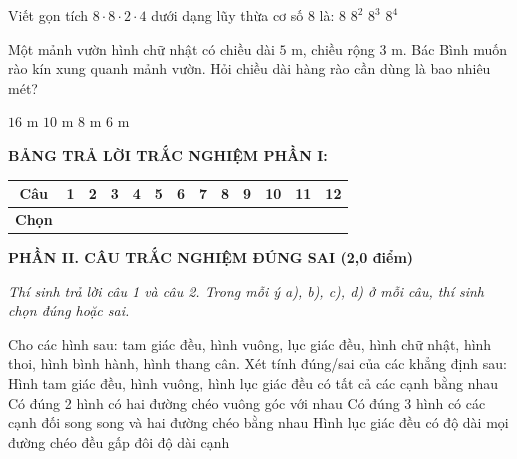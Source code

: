 \documentclass[12pt,a4paper]{article}
\begin{document}
\begin{ex}
Viết gọn tích $8 \cdot 8 \cdot 2 \cdot 4$ dưới dạng lũy thừa cơ số 8 là:
\choice
{$8$}
{$8^2$}
{\True $8^3$}
{$8^4$}
\end{ex}

\begin{ex}
Một mảnh vườn hình chữ nhật có chiều dài $5\text{ m}$, chiều rộng $3\text{ m}$. Bác Bình muốn rào kín xung quanh mảnh vườn. Hỏi chiều dài hàng rào cần dùng là bao nhiêu mét?
\begin{center}
\end{center}
\choice
{\True $16\text{ m}$}
{$10\text{ m}$}
{$8\text{ m}$}
{$6\text{ m}$}
\end{ex}


\vspace{1mm}
\noindent\textbf{BẢNG TRẢ LỜI TRẮC NGHIỆM PHẦN I:}
\begin{center}
\begin{tabular}{|c|c|c|c|c|c|c|c|c|c|c|c|c|}
\hline
\textbf{Câu} & \textbf{1} & \textbf{2} & \textbf{3} & \textbf{4} & \textbf{5} & \textbf{6} & \textbf{7} & \textbf{8} & \textbf{9} & \textbf{10} & \textbf{11} & \textbf{12} \\
\hline
\textbf{Chọn} & \rule{0pt}{0.65cm} & & & & & & & & & & & \\
\hline
\end{tabular}
\end{center}
\vspace{2mm}

\setcounter{ex}{0}
\noindent\textbf{\large PHẦN II. CÂU TRẮC NGHIỆM ĐÚNG SAI (2,0 điểm)}

\textit{Thí sinh trả lời câu 1 và câu 2. Trong mỗi ý a), b), c), d) ở mỗi câu, thí sinh chọn đúng hoặc sai.}

\vspace{1mm}
\begin{ex}
Cho các hình sau: tam giác đều, hình vuông, lục giác đều, hình chữ nhật, hình thoi, hình bình hành, hình thang cân. Xét tính đúng/sai của các khẳng định sau:
\choiceTF
{\True Hình tam giác đều, hình vuông, hình lục giác đều có tất cả các cạnh bằng nhau}
{\True Có đúng 2 hình có hai đường chéo vuông góc với nhau}
{\True Có đúng 3 hình có các cạnh đối song song và hai đường chéo bằng nhau}
{Hình lục giác đều có độ dài mọi đường chéo đều gấp đôi độ dài cạnh}
\end{ex}
\end{document}

